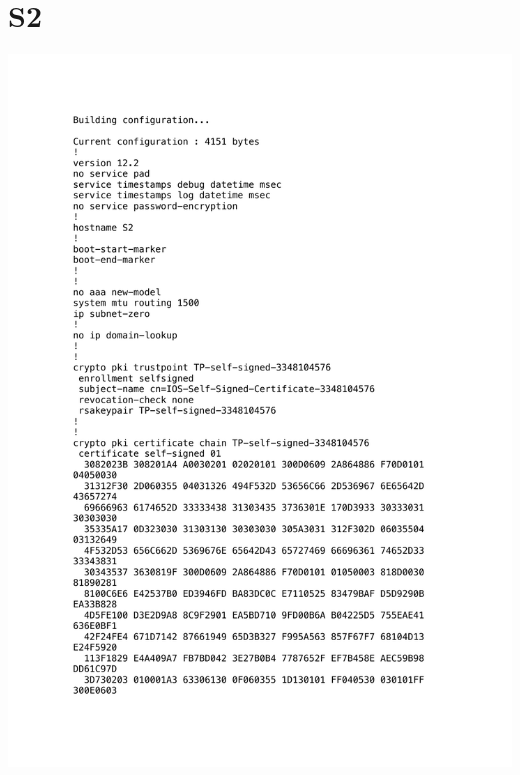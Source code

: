 \documentclass[11pt,a4paper]{scrreprt}
\begin{document}
\section{S2}
\vspace{-1cm}
\includegraphics[height=\dimexpr\textheight-4\baselineskip\relax,page=1]{../config_files/S2.pdf}

\end{document}
